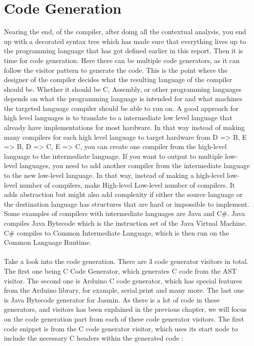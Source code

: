 \section{Code Generation}
Nearing the end, of the compiler, after doing all the contextual analysis, you end up with a decorated syntax tree which has made sure that everything lives up to the programming language that has got defined earlier in this report. Then it is time for code generation.
Here there can be multiple code generators, as it can follow the visitor pattern to generate the code. This is the point where the designer of the compiler decides what the resulting language of the compiler should be. Whether it should be C, Assembly, or other programming languages depends on what the programming language is intended for and what machines the targeted language compiler should be able to run on. 
A good approach for high level languages is to translate to a intermediate low level language that already have implementations for most hardware.  
In that way instead of making many compilers for each high level language to target hardware from D => B, E => B, D => C, E => C, you can create one compiler from the high-level language to the intermediate language. If you want to output to multiple low-level languages, you need to add another compiler from the intermediate language to the new low-level language. In that way, instead of making a high-level \* low-level number of compilers, make High-level \+ Low-level number of compilers. It adds abstraction but might also add complexity if either the source language or the destination language has structures that are hard or impossible to implement. Some examples of compilers with intermediate languages are Java and C\#. Java compiles Java Bytecode which is the instruction set of the Java Virtual Machine. C\# compiles to Common Intermediate Language, which is then run on the Common Language Runtime.\\
\\
Take a look into the code generation. There are 3 code generator visitors in total. The first one being C Code Generator, which generates C code from the AST visitor. The second one is Arduino C code generator, which has special features from the Arduino library, for example, serial.print and many more. The last one is Java Bytecode generator for Jasmin. As there is a lot of code in these generators, and visitors has been explained in the previous chapter, we will focus on the code generation part from each of these code generator visitors.
The first code snippet is from the C code generator visitor, which uses its start node to include the necessary C headers within the generated code : \\

\noindent\newline


